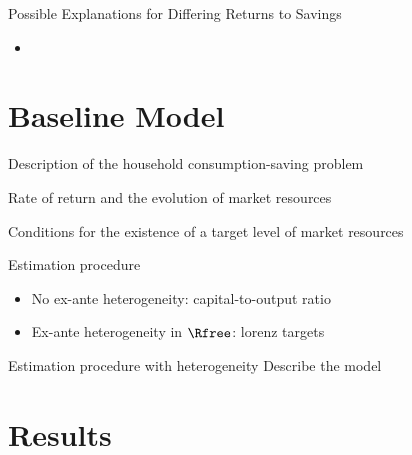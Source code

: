 \documentclass[pdflatex]{beamer}
\begin{document}
\begin{frame}
    \begin{figure}[H]
    \centering
    \caption{}
    \end{figure}
\end{frame}

\begin{frame}{Possible Explanations for Differing Returns to Savings}

   \begin{itemize}
    \item 
    \end{itemize}
  
\end{frame}


\section{Baseline Model}

\begin{frame}{Description of the household consumption-saving problem}
\end{frame}

\begin{frame}{Rate of return and the evolution of market resources}
\end{frame}

\begin{frame}{Conditions for the existence of a target level of market resources}
\end{frame}

\begin{frame}{Estimation procedure}
  \begin{itemize}
  \item No ex-ante heterogeneity: capital-to-output ratio
  \item Ex-ante heterogeneity in $\Rfree$: lorenz targets
  \end{itemize}
  
\end{frame}

\begin{frame}{Estimation procedure with heterogeneity}
  Describe the model 
\end{frame}

\section{Results}
\end{document}
